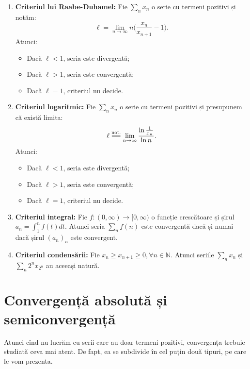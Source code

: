\documentclass[11pt,a4paper]{article}
\newcommand\NN{\mathbb{N}}
\theoremstyle{dotless}
\theoremstyle{dotlessdr}
\begin{document}
\begin{enumerate}[(1)]
\begin{itemize}
      \item Dacă $\ell < 1$, seria este convergentă;
      \item Dacă $\ell > 1$, seria este divergentă;
      \item Dacă $\ell = 1$, criteriul nu decide.
    \end{itemize}
  \item \textbf{Criteriul lui Raabe-Duhamel:} Fie $\sum_n x_n$ o serie cu termeni
    pozitivi și notăm:
    \[
      \ell = \lim_{n \to \infty} n \Big( \frac{x_n}{x_{n+1}} - 1 \Big).
    \]
    Atunci:
    \begin{itemize}
      \item Dacă $\ell < 1$, seria este divergentă;
      \item Dacă $\ell > 1$, seria este convergentă;
      \item Dacă $\ell = 1$, criteriul nu decide.
    \end{itemize}
  \item \textbf{Criteriul logaritmic:} Fie $\sum_n x_n$ o serie cu termeni pozitivi
    și presupunem că există limita:
    \[
      \ell \stackrel{\text{not.}}{=\joinrel=} \lim_{n \to \infty} %
    \frac{\ln \frac{1}{x_n}}{\ln n}.
    \]
    Atunci:
    \begin{itemize}
      \item Dacă $\ell < 1$, seria este divergentă;
      \item Dacă $\ell > 1$, seria este convergentă;
      \item Dacă $\ell = 1$, criteriul nu decide.
    \end{itemize}
  \item \textbf{Criteriul integral:} Fie $f: (0, \infty) \to [0, \infty)$ o funcție
    crescătoare și șirul $a_n = \int_1^n f(t) dt$. Atunci seria $\sum_n f(n)$ este
    convergentă dacă și numai dacă șirul $(a_n)_n$ este convergent.
  \item \textbf{Criteriul condensării:} Fie $x_n \geq x_{n + 1} \geq 0, \forall n \in \NN$.
    Atunci seriile $\sum_n x_n$ și $\sum_n 2^n x_{2^n}$ au aceeași natură.
\end{enumerate}


\section{Convergență absolută și semiconvergență}

Atunci cînd nu lucrăm cu serii care au doar termeni pozitivi, convergența trebuie
studiată ceva mai atent. De fapt, ea se subdivide în cel puțin două tipuri, pe
care le vom prezenta.
\end{document}
